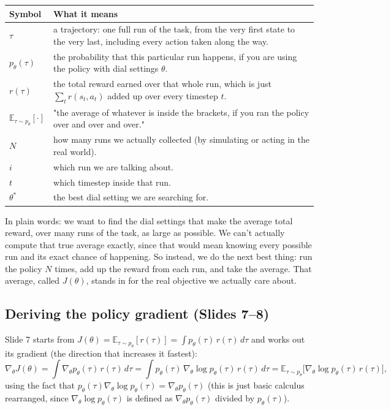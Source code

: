 \documentclass[11pt]{article}
\begin{document}
\begin{center}
\begin{tabular}{@{} >{\raggedright\arraybackslash}p{} >{\raggedright\arraybackslash}p{} @{}}
\toprule
\textbf{Symbol} & \textbf{What it means} \\
\midrule
$\tau$ & a trajectory: one full run of the task, from the very first state to the very last, including every action taken along the way. \\
$p_\theta(\tau)$ & the probability that this particular run happens, if you are using the policy with dial settings $\theta$. \\
$r(\tau)$ & the total reward earned over that whole run, which is just $\sum_t r(s_t,a_t)$ added up over every timestep $t$. \\
$\mathbb{E}_{\tau\sim p_\theta}[\cdot]$ & "the average of whatever is inside the brackets, if you ran the policy over and over and over." \\
$N$ & how many runs we actually collected (by simulating or acting in the real world). \\
$i$ & which run we are talking about. \\
$t$ & which timestep inside that run. \\
$\theta^{*}$ & the best dial setting we are searching for. \\
\bottomrule
\end{tabular}
\end{center}

In plain words: we want to find the dial settings that make the average total reward, over many runs of the task, as large as possible. We can't actually compute that true average exactly, since that would mean knowing every possible run and its exact chance of happening. So instead, we do the next best thing: run the policy $N$ times, add up the reward from each run, and take the average. That average, called $J(\theta)$, stands in for the real objective we actually care about.

\subsection{Deriving the policy gradient (Slides 7--8)}

Slide 7 starts from $J(\theta)=\mathbb{E}_{\tau\sim p_\theta}[r(\tau)] = \int p_\theta(\tau)\,r(\tau)\,d\tau$ and works out its gradient (the direction that increases it fastest):
$$\nabla_\theta J(\theta) = \int \nabla_\theta p_\theta(\tau)\, r(\tau)\, d\tau = \int p_\theta(\tau)\,\nabla_\theta \log p_\theta(\tau)\, r(\tau)\, d\tau = \mathbb{E}_{\tau\sim p_\theta}\big[\nabla_\theta \log p_\theta(\tau)\, r(\tau)\big],$$
using the fact that $p_\theta(\tau)\nabla_\theta\log p_\theta(\tau) = \nabla_\theta p_\theta(\tau)$ (this is just basic calculus rearranged, since $\nabla_\theta \log p_\theta(\tau)$ is defined as $\nabla_\theta p_\theta(\tau)$ divided by $p_\theta(\tau)$).
\end{document}
